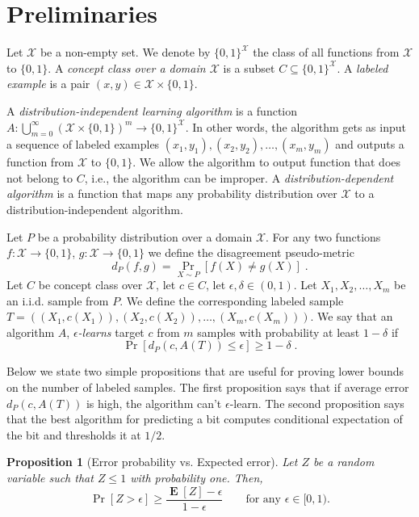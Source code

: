\documentclass[10pt]{article}
\newtheorem{proposition}{Proposition}
\newcommand{\X}{\mathcal{X}}
\DeclareMathOperator{\Exp}{\mathbf{E}}
\begin{document}
\section{Preliminaries}

Let $\X$ be a non-empty set. We denote by $\{0,1\}^\X$ the class of all
functions from $\X$ to $\{0,1\}$. A \emph{concept class over a domain $\X$} is a
subset $C \subseteq \{0,1\}^\X$. A \emph{labeled example} is a pair $(x,y) \in
\X \times \{0,1\}$.

A \emph{distribution-independent learning algorithm} is a function
$A:\bigcup_{m=0}^\infty \left(\X \times \{0,1\} \right)^m \to \{0,1\}^\X$. In
other words, the algorithm gets as input a sequence of labeled examples $(x_1,
y_1), (x_2, y_2), \dots, (x_m, y_m)$ and outputs a function from $\X$ to
$\{0,1\}$. We allow the algorithm to output function that does not belong to
$C$, i.e., the algorithm can be improper. A \emph{distribution-dependent algorithm}
is a function that maps any probability distribution over $\X$ to a
distribution-independent algorithm.

Let $P$ be a probability distribution over a domain $\X$. For any two functions
$f:\X \to \{0,1\}$, $g:\X \to \{0,1\}$ we define the disagreement pseudo-metric
$$
d_P(f,g) = \Pr_{X \sim P}[f(X) \neq g(X)] \; .
$$
Let $C$ be concept class over $\X$, let $c \in C$, let $\epsilon, \delta \in (0,1)$.
Let  $X_1, X_2, \dots, X_m$ be an i.i.d. sample from $P$. We define the corresponding
labeled sample $T = ((X_1, c(X_1)), (X_2, c(X_2)), \dots, (X_m, c(X_m)))$.
We say that an algorithm $A$, \emph{$\epsilon$-learns} target $c$ from $m$ samples
with probability at least $1 - \delta$ if
$$
\Pr \left[d_P(c,A(T)) \le \epsilon \right]  \ge 1 - \delta \; .
$$

Below we state two simple propositions that are useful for proving lower bounds
on the number of labeled samples. The first proposition says that if average
error $d_P(c,A(T))$ is high, the algorithm can't $\epsilon$-learn. The second
proposition says that the best algorithm for predicting a bit computes
conditional expectation of the bit and thresholds it at $1/2$.

\begin{proposition}[Error probability vs. Expected error]
\label{proposition:error-probability-vs-expected-error}
Let $Z$ be a random variable such that $Z \le 1$ with probability one.
Then,
$$
\Pr[Z > \epsilon] \ge \frac{\Exp[Z] - \epsilon}{1 - \epsilon} \qquad \text{for any $\epsilon \in [0, 1)$.}
$$
\end{proposition}
\end{document}
